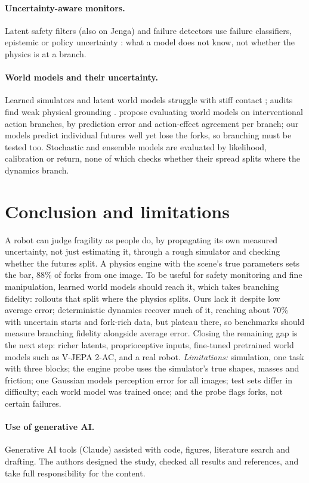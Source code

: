 \documentclass{article}
\begin{document}
\paragraph{Uncertainty-aware monitors.} Latent safety filters (also on Jenga) and failure detectors use
failure classifiers, epistemic or policy uncertainty \citep{nakamura2025generalizing,seo2025uncertainty,xu2025failure,agia2024unpacking}:
what a model does not know, not whether the physics is at a branch.
\paragraph{World models and their uncertainty.} Learned simulators and latent world models
\citep{sanchezgonzalez2020learning,allen2023fignet,zhou2025dinowm,assran2025vjepa2,hafner2025dreamerv3}
struggle with stiff contact \citep{parmar2021fundamental}; audits find weak physical grounding
\citep{bear2021physion,motamed2026physicsiq,yang2026mirabench}.
\citet{yu2026evaluated} propose evaluating world models on interventional action branches, by
prediction error and action-effect agreement per branch; our models predict individual futures well yet
lose the forks, so branching must be tested too. Stochastic and ensemble models
\citep{chua2018pets,lakshminarayanan2017ensembles} are evaluated by likelihood, calibration or return,
none of which checks whether their spread splits where the dynamics branch.

\section{Conclusion and limitations}
A robot can judge fragility as people do, by propagating its own measured uncertainty, not just
estimating it, through a rough simulator and checking whether the futures split. A physics engine with the scene's true parameters sets the bar, 88\% of
forks from one image. To be useful for safety monitoring and fine manipulation, learned world models
should reach it, which takes branching fidelity: rollouts that split where the physics splits. Ours lack
it despite low average error; deterministic dynamics recover much of it, reaching about 70\% with uncertain
starts and fork-rich data, but plateau there, so
benchmarks should measure branching fidelity alongside average error. Closing the remaining gap is the next step:
richer latents, proprioceptive inputs, fine-tuned pretrained world models such as V-JEPA 2-AC, and a
real robot. \emph{Limitations:} simulation, one task with three blocks; the engine probe uses the simulator's
true shapes, masses and friction; one Gaussian models perception error for all images; test sets differ in
difficulty; each world model was trained once; and the probe flags forks, not certain failures.

\paragraph{Use of generative AI.} Generative AI tools (Claude) assisted with code, figures, literature
search and drafting. The authors designed the study, checked all results and references, and take full
responsibility for the content.


\end{document}
